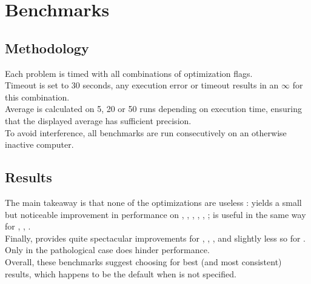 \section{Benchmarks}

\subsection{Methodology}

Each problem is timed with all combinations of optimization flags.\\
Timeout is set to 30 seconds, any execution error or timeout results in an
\(\infty\) for this combination.\\

Average is calculated on 5, 20 or 50 runs depending on execution time, ensuring
that the displayed average has sufficient precision.\\

To avoid interference, all benchmarks are run consecutively on an otherwise
inactive computer.\\


\subsection{Results}

\begin{center}\label{bench-results}

\end{center}

The main takeaway is that none of the optimizations are useless :
 yields a small but noticeable improvement in performance on
, , , , , ;
 is useful in the same way for , , .\\
Finally,  provides quite spectacular improvements for ,
, ,  and slightly less so for .
Only in the pathological case  does  hinder performance.\\

Overall, these benchmarks suggest choosing  for best
(and most consistent) results, which happens to be the default when  is not
specified.\\

